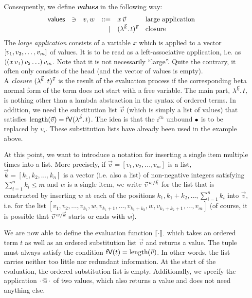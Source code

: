\documentclass[submission,copyright,creativecommons]{eptcs}
\newcommand{\define}[1]{\mbox{\textbf{\textit{#1}}}}
\begin{document}
Consequently, we define \define{values} in the following way:
\[ 
\begin{array}{lllrll@{\qquad}}
\mathsf{values}       & \ni & v,w & ::= & x \sspace \vec v & \mbox{large application} \\ 
			                   &&& \mid & \Val {\vec k} t {\vec v} & \mbox{closure} \\ 
\end{array}
\]
The \emph{large application} consists of a variable $x$ which is applied to a vector $\ve{v_1, v_2, \ldots, v_m}$ of values. It is to be read as a left-associative application, i.e. as $\pa{\pa{x \, v_1} v_2 \ldots } v_m$. 
Note that it is not necessarily ``large''. Quite the contrary, it often only consists of the head (and the vector of values is empty).\\
A \emph{closure} $\Val {\vec k} t {\vec v}$ is the result of the evaluation process if the corresponding beta normal form of the term does not start with a free variable. The main part, $\LaO {\vec k} t$, is nothing other than a lambda abstraction in the syntax of ordered terms.
In addition, we need the substitution list $\vec v$ (which is simply a list of values) that satisfies $\length {\vec v} = \freevars{\LaO {\vec k} t}$. %
The idea is that the $i^{th}$ unbound $\ovar$ is to be replaced by $v_i$.  These substitution lists have already been used in the example above.


At this point, we want to introduce a notation for inserting a single item multiple times into a list. More precisely, if $\vec v = [v_1, v_2, \ldots, v_m]$ is a list, 
$\vec k = [k_1, k_2, \ldots, k_n]$ is a vector (i.e. also a list) of  non-negative integers satisfying $\sum_{i=1}^n k_i \leq m$ and $w$ is a single item, we write $\multiinsert {\vec v} {\vec k} {w}$  for the list that is constructed by inserting $w$ at each of the positions $k_1, k_1 + k_2, \ldots, \sum_{i=1}^n k_i$ into $\vec v$, i.e. for the list $[v_1, v_2, \ldots, v_{k_1}, w, v_{k_1 + 1}, \ldots, v_{k_1 + k_2}, w, v_{k_1 + k_2 + 1}, \ldots, v_m]$ (of course, it is possible that $\multiinsert {\vec v} {\vec k} {w}$ starts or ends with $w$).


We are now able to define the evaluation function $\ev {\cdot} {\cdot}$ which takes an ordered term $t$ as well as an ordered substitution list $\vec v$ and returns a value. The tuple must always satisfy the condition $\freevars t = \length {\vec v}$. In other words, the list carries neither too little nor redundant information.
At the start of the evaluation, the ordered substitution list is empty. 
Additionally, we specify the application $\cdot \ap \cdot$ of two values, which also returns a value and does not need anything else.
\end{document}
